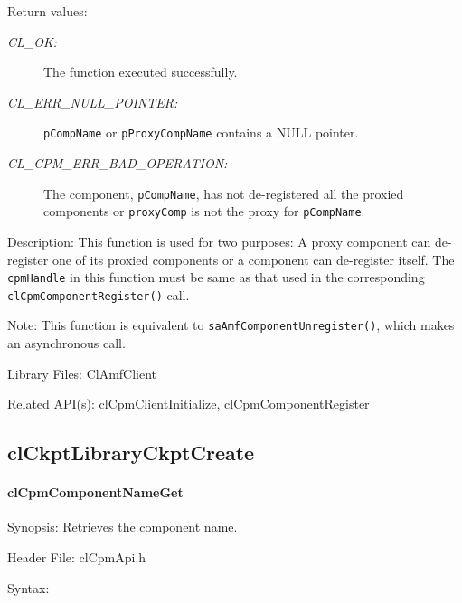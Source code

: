 {\begin{Desc}
\item[Return values:]
\begin{description}
\item[{\em CL\_\-OK:}]The function executed successfully. 
\item[{\em CL\_\-ERR\_\-NULL\_\-POINTER:}]{\tt{pCompName}} or {\tt{pProxyCompName}} contains a NULL pointer. 
\item[{\em CL\_\-CPM\_\-ERR\_\-BAD\_\-OPERATION:}]The component, {\tt{p\-Comp\-Name}}, has not de-registered all the proxied components or 
{\tt{proxy\-Comp}} is not the proxy for {\tt{p\-Comp\-Name}}.
\end{description}
\end{Desc}
\begin{Desc}
\item[Description:]This function is used for two purposes: A proxy component can de-register one of its proxied components or a component can de-register 
itself. The {\tt{cpm\-Handle}} in this function must be same as that used in the corresponding {\tt{cl\-Cpm\-Component\-Register()}} call.\end{Desc}
\begin{Desc}
\item[Note:]This function is equivalent to {\tt{sa\-Amf\-Component\-Unregister()}}, which makes an asynchronous call.\end{Desc}
\begin{Desc}
\item[Library Files:]Cl\-Amf\-Client\end{Desc}

\begin{Desc}
\item[Related API(s):]\hyperlink{group__group14}{cl\-Cpm\-Client\-Initialize}, \hyperlink{group__group14}{cl\-Cpm\-Component\-Register} \end{Desc}
\newpage



\subsection{clCkptLibraryCkptCreate}
\hypertarget{pagecpm114}{}\paragraph{cl\-Cpm\-Component\-Name\-Get}\label{pagecpm114}
\begin{Desc}
\item[Synopsis:]Retrieves the component name.\end{Desc}
\begin{Desc}
\item[Header File:]clCpmApi.h\end{Desc}
\begin{Desc}
\item[Syntax:]


\end{Desc}}
